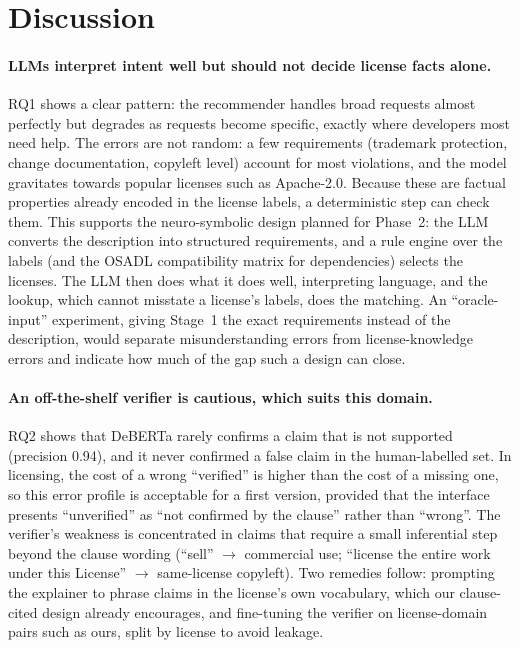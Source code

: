 \section{Discussion}
\label{s:discussion}

\paragraph{LLMs interpret intent well but should not decide license facts alone.}
RQ1 shows a clear pattern: the recommender handles broad requests almost perfectly but degrades as requests become specific, exactly where developers most need help. The errors are not random: a few requirements (trademark protection, change documentation, copyleft level) account for most violations, and the model gravitates towards popular licenses such as Apache-2.0. Because these are factual properties already encoded in the license labels, a deterministic step can check them. This supports the neuro-symbolic design planned for Phase~2: the LLM converts the description into structured requirements, and a rule engine over the labels (and the OSADL compatibility matrix for dependencies) selects the licenses. The LLM then does what it does well, interpreting language, and the lookup, which cannot misstate a license's labels, does the matching. An ``oracle-input'' experiment, giving Stage~1 the exact requirements instead of the description, would separate misunderstanding errors from license-knowledge errors and indicate how much of the gap such a design can close.

\paragraph{An off-the-shelf verifier is cautious, which suits this domain.}
RQ2 shows that DeBERTa rarely confirms a claim that is not supported (precision 0.94), and it never confirmed a false claim in the human-labelled set. In licensing, the cost of a wrong ``verified'' is higher than the cost of a missing one, so this error profile is acceptable for a first version, provided that the interface presents ``unverified'' as ``not confirmed by the clause'' rather than ``wrong''. The verifier's weakness is concentrated in claims that require a small inferential step beyond the clause wording (``sell'' $\rightarrow$ commercial use; ``license the entire work under this License'' $\rightarrow$ same-license copyleft). Two remedies follow: prompting the explainer to phrase claims in the license's own vocabulary, which our clause-cited design already encourages, and fine-tuning the verifier on license-domain pairs such as ours, split by license to avoid leakage.


